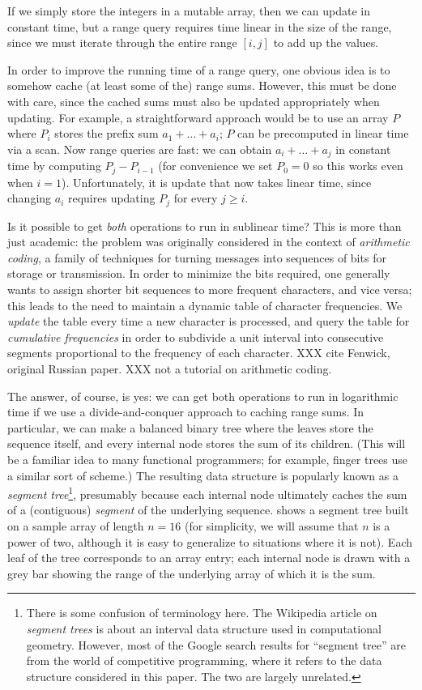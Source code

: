 \documentclass[acmsmall,review]{acmart}\settopmatter{printfolios=true,printccs=false,printacmref=false}
\providecommand{\pref}{}
\renewcommand{\pref}[1]{\prettyref{#1}}
\begin{document}
If we simply store the integers in a mutable array, then we can update
in constant time, but a range query requires time linear in the size
of the range, since we must iterate through the entire range $[i, j]$
to add up the values.

In order to improve the running time of a range query, one obvious
idea is to somehow cache (at least some of the) range sums.  However,
this must be done with care, since the cached sums must also be
updated appropriately when updating.  For example, a straightforward
approach would be to use an array $P$ where $P_i$ stores the prefix
sum $a_1 + \dots + a_i$; $P$ can be precomputed in linear time via a
scan.  Now range queries are fast: we can obtain $a_i + \dots + a_j$
in constant time by computing $P_j - P_{i-1}$ (for convenience we set
$P_0 = 0$ so this works even when $i=1$).  Unfortunately, it is update
that now takes linear time, since changing $a_i$ requires updating
$P_j$ for every $j \geq i$.

Is it possible to get \emph{both} operations to run in sublinear time?
This is more than just academic: the problem was originally considered
in the context of \emph{arithmetic coding}, a family of techniques for
turning messages into sequences of bits for storage or transmission.
In order to minimize the bits required, one generally wants to assign
shorter bit sequences to more frequent characters, and vice versa;
this leads to the need to maintain a dynamic table of character
frequencies.  We \emph{update} the table every time a new character is
processed, and query the table for \emph{cumulative frequencies} in
order to subdivide a unit interval into consecutive segments
proportional to the frequency of each character.  XXX cite Fenwick,
original Russian paper.  XXX not a tutorial on arithmetic coding.

The answer, of course, is yes: we can get both operations to run in
logarithmic time if we use a divide-and-conquer approach to caching
range sums.  In particular, we can make a balanced binary tree where
the leaves store the sequence itself, and every internal node stores
the sum of its children.  (This will be a familiar idea to many
functional programmers; for example, finger trees
\citep{Hinze-Paterson:FingerTree} use a similar sort of scheme.)  The
resulting data structure is popularly known as a \emph{segment
  tree}\footnote{There is some confusion of terminology here.  The
  Wikipedia article on \emph{segment trees} \citep{wiki:SegmentTree}
  is about an interval data structure used in computational geometry.
  However, most of the Google search results for ``segment tree'' are
  from the world of competitive programming, where it refers to the
  data structure considered in this paper.  The two are largely
  unrelated.}, presumably because each internal node ultimately caches
the sum of a (contiguous) \emph{segment} of the underlying sequence.
\pref{fig:segment-tree} shows a segment tree built on a sample array
of length $n=16$ (for simplicity, we will assume that $n$ is a power
of two, although it is easy to generalize to situations where it is
not). Each leaf of the tree corresponds to an array entry; each
internal node is drawn with a grey bar showing the range of the
underlying array of which it is the sum.
\end{document}
